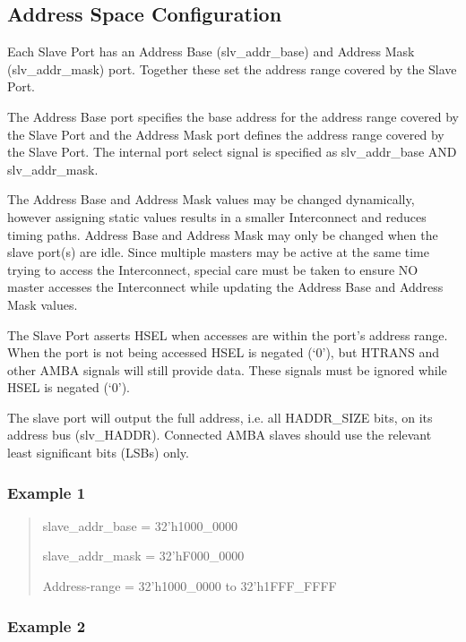 \subsection{Address Space
Configuration}\label{address-space-configuration}

Each Slave Port has an Address Base (slv\_addr\_base) and Address Mask
(slv\_addr\_mask) port. Together these set the address range covered by
the Slave Port.

The Address Base port specifies the base address for the address range
covered by the Slave Port and the Address Mask port defines the address
range covered by the Slave Port. The internal port select signal is
specified as slv\_addr\_base AND slv\_addr\_mask.

The Address Base and Address Mask values may be changed dynamically,
however assigning static values results in a smaller Interconnect and
reduces timing paths. Address Base and Address Mask may only be changed
when the slave port(s) are idle. Since multiple masters may be active at
the same time trying to access the Interconnect, special care must be
taken to ensure NO master accesses the Interconnect while updating the
Address Base and Address Mask values.

The Slave Port asserts HSEL when accesses are within the port's address
range. When the port is not being accessed HSEL is negated (`0'), but
HTRANS and other AMBA signals will still provide data. These signals
must be ignored while HSEL is negated (`0').

The slave port will output the full address, i.e. all HADDR\_SIZE bits,
on its address bus (slv\_HADDR). Connected AMBA slaves should use the
relevant least significant bits (LSBs) only.

\subsubsection{Example 1}\label{example-1}

\begin{quote}
slave\_addr\_base = 32'h1000\_0000

slave\_addr\_mask = 32'hF000\_0000

Address-range = 32'h1000\_0000 to 32'h1FFF\_FFFF
\end{quote}

\subsubsection{Example 2}\label{example-2}

